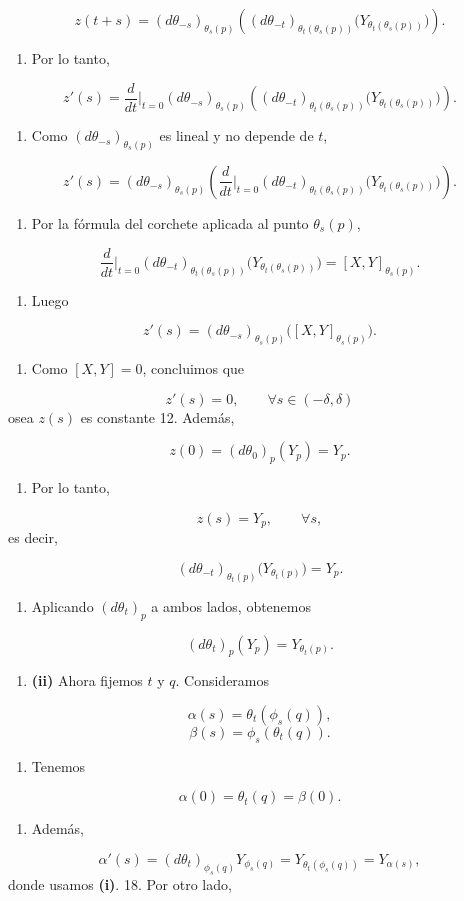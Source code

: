 \begin{bookproof}{}
\[
z(t+s)=(d\theta_{-s})_{\theta_s(p)}\left((d\theta_{-t})_{\theta_t(\theta_s(p))}\big(Y_{\theta_t(\theta_s(p))}\big)\right).
\]
\begin{enumerate}[start=7]
\item Por lo tanto,
\end{enumerate}
\[
z'(s)=\frac{d}{dt}\Big|_{t=0}(d\theta_{-s})_{\theta_s(p)}\left((d\theta_{-t})_{\theta_t(\theta_s(p))}\big(Y_{\theta_t(\theta_s(p))}\big)\right).
\]
\begin{enumerate}[start=8]
\item Como $(d\theta_{-s})_{\theta_s(p)}$ es lineal y no depende de $t$,
\end{enumerate}
\[
z'(s)=(d\theta_{-s})_{\theta_s(p)}\left(\frac{d}{dt}\Big|_{t=0}(d\theta_{-t})_{\theta_t(\theta_s(p))}\big(Y_{\theta_t(\theta_s(p))}\big)\right).
\]
\begin{enumerate}[start=9]
\item Por la fórmula del corchete aplicada al punto $\theta_s(p)$,
\end{enumerate}
\[
\frac{d}{dt}\Big|_{t=0}(d\theta_{-t})_{\theta_t(\theta_s(p))}\big(Y_{\theta_t(\theta_s(p))}\big)=[X,Y]_{\theta_s(p)}.
\]
\begin{enumerate}[start=10]
\item Luego
\end{enumerate}
\[
z'(s)=(d\theta_{-s})_{\theta_s(p)}\big([X,Y]_{\theta_s(p)}\big).
\]
\begin{enumerate}[start=11]
\item Como $[X,Y]=0$, concluimos que
\end{enumerate}
\[
z'(s)=0,\qquad \forall s\in (-\delta ,\delta )
\]
osea $z(s)$ es constante 12. Además,

\[
z(0)=(d\theta_0)_p(Y_p)=Y_p.
\]
\begin{enumerate}[start=13]
\item Por lo tanto,
\end{enumerate}
\[
z(s)=Y_p,\qquad \forall s,
\]
es decir,

\[
(d\theta_{-t})_{\theta_t(p)}\big(Y_{\theta_t(p)}\big)=Y_p.
\]
\begin{enumerate}[start=14]
\item Aplicando $(d\theta_t)_p$ a ambos lados, obtenemos
\end{enumerate}
\[
(d\theta_t)_p(Y_p)=Y_{\theta_t(p)}.
\]
\begin{enumerate}[start=15]
\item \textbf{(ii)} Ahora fijemos $t$ y $q$. Consideramos
\end{enumerate}
\[
\alpha(s)=\theta_t(\phi_s(q)),
\]
\[
\beta(s)=\phi_s(\theta_t(q)).
\]
\begin{enumerate}[start=16]
\item Tenemos
\end{enumerate}
\[
\alpha(0)=\theta_t(q)=\beta(0).
\]
\begin{enumerate}[start=17]
\item Además,
\end{enumerate}
\[
\alpha'(s)=(d\theta_t)_{\phi_s(q)}Y_{\phi_s(q)}=Y_{\theta_t(\phi_s(q))}=Y_{\alpha(s)},
\]
donde usamos \textbf{(i)}. 18. Por otro lado,


\end{bookproof}
